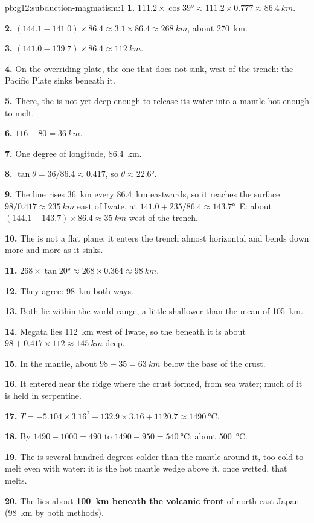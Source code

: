 \begin{solution}{pb:g12:subduction-magmatism:1}
\textbf{1.} $111.2 \times \cos\ang{39} \approx 111.2 \times 0.777 \approx
\qty{86.4}{km}$.

\textbf{2.} $(144.1 - 141.0) \times 86.4 \approx 3.1 \times 86.4 \approx
\qty{268}{km}$, about \qty{270}{km}.

\textbf{3.} $(141.0 - 139.7) \times 86.4 \approx \qty{112}{km}$.

\textbf{4.} On the overriding plate, the one that does not sink, west of the
trench: the Pacific Plate sinks beneath it.

\textbf{5.} There, the  is not yet deep enough to release its water into
a mantle hot enough to melt.

\textbf{6.} $116 - 80 = \qty{36}{km}$.

\textbf{7.} One degree of longitude, \qty{86.4}{km}.

\textbf{8.} $\tan\theta = 36/86.4 \approx 0.417$, so $\theta \approx
\ang{22.6}$.

\textbf{9.} The line rises \qty{36}{km} every \qty{86.4}{km} eastwards, so it
reaches the surface $98/0.417 \approx \qty{235}{km}$ east of Iwate, at
$141.0 + 235/86.4 \approx \ang{143.7}$~E: about $(144.1 - 143.7) \times 86.4
\approx \qty{35}{km}$ west of the trench.

\textbf{10.} The  is not a flat plane: it enters the trench almost
horizontal and bends down more and more as it sinks.

\textbf{11.} $268 \times \tan\ang{20} \approx 268 \times 0.364 \approx
\qty{98}{km}$.

\textbf{12.} They agree: \qty{98}{km} both ways.

\textbf{13.} Both lie within the world range, a little shallower than the
mean of \qty{105}{km}.

\textbf{14.} Megata lies \qty{112}{km} west of Iwate, so the  beneath it
is about $98 + 0.417 \times 112 \approx \qty{145}{km}$ deep.

\textbf{15.} In the mantle, about $98 - 35 = \qty{63}{km}$ below the base of
the crust.

\textbf{16.} It entered near the ridge where the crust formed, from sea
water; much of it is held in serpentine.

\textbf{17.} $T = -5.104 \times 3.16^2 + 132.9 \times 3.16 + 1120.7 \approx
\qty{1490}{\celsius}$.

\textbf{18.} By $1490 - 1000 = 490$ to $1490 - 950 = \qty{540}{\celsius}$:
about \qty{500}{\celsius}.

\textbf{19.} The  is several hundred degrees colder than the mantle
around it, too cold to melt even with water: it is the hot mantle wedge above
it, once wetted, that melts.

\textbf{20.} The  lies about \textbf{\qty{100}{km} beneath the volcanic
front} of north-east Japan (\qty{98}{km} by both methods).
\end{solution}
